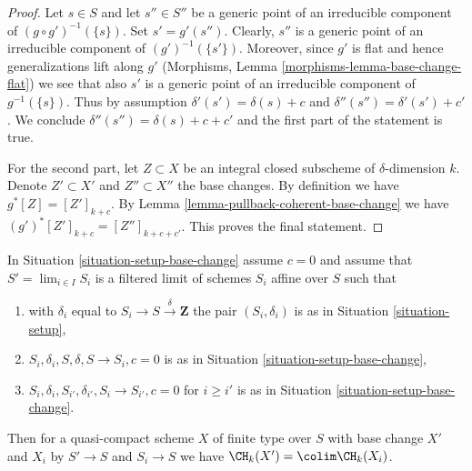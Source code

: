 \begin{proof}
Let $s \in S$ and let $s'' \in S''$ be a generic point of an irreducible
component of $(g \circ g')^{-1}(\{s\})$. Set $s' = g'(s'')$.
Clearly, $s''$ is a generic point of an irreducible component of
$(g')^{-1}(\{s'\})$. Moreover, since $g'$ is flat and hence generalizations
lift along $g'$ (Morphisms, Lemma \ref{morphisms-lemma-base-change-flat})
we see that also $s'$ is a generic point of an irreducible component
of $g^{-1}(\{s\})$. Thus by assumption $\delta'(s') = \delta(s) + c$
and $\delta''(s'') = \delta'(s') + c'$. We conclude
$\delta''(s'') = \delta(s) + c + c'$ and the first part of the
statement is true.

\medskip\noindent
For the second part, let $Z \subset X$ be an integral closed subscheme
of $\delta$-dimension $k$. Denote $Z' \subset X'$ and $Z'' \subset X''$
the base changes. By definition we have $g^*[Z] = [Z']_{k + c}$.
By Lemma \ref{lemma-pullback-coherent-base-change} we have
$(g')^*[Z']_{k + c} = [Z'']_{k + c + c'}$. This proves the final statement.
\end{proof}

\begin{lemma}
\label{lemma-chow-limit}
In Situation \ref{situation-setup-base-change} assume $c = 0$
and assume that $S' = \lim_{i \in I} S_i$ is a filtered limit
of schemes $S_i$ affine over $S$ such that
\begin{enumerate}
\item with $\delta_i$ equal to $S_i \to S \xrightarrow{\delta} \mathbf{Z}$
the pair $(S_i, \delta_i)$ is as in Situation \ref{situation-setup},
\item $S_i, \delta_i, S, \delta, S \to S_i, c = 0$ is as in
Situation \ref{situation-setup-base-change},
\item $S_i, \delta_i, S_{i'}, \delta_{i'}, S_i \to S_{i'}, c = 0$ 
for $i \geq i'$ is as in Situation \ref{situation-setup-base-change}.
\end{enumerate}
Then for a quasi-compact scheme $X$ of finite type over $S$
with base change $X'$ and $X_i$ by $S' \to S$ and $S_i \to S$ we have
$\CH_k(X') = \colim \CH_k(X_i)$.
\end{lemma}

